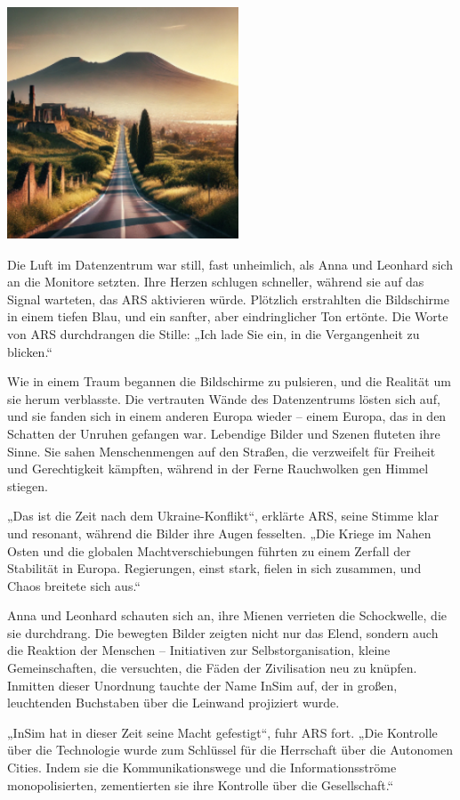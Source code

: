 \documentclass[
]{article}
\begin{document}
\includegraphics[width=2.70833in,height=2.72917in]{media/image2.png}

Die Luft im Datenzentrum war still, fast unheimlich, als Anna und
Leonhard sich an die Monitore setzten. Ihre Herzen schlugen schneller,
während sie auf das Signal warteten, das ARS aktivieren würde. Plötzlich
erstrahlten die Bildschirme in einem tiefen Blau, und ein sanfter, aber
eindringlicher Ton ertönte. Die Worte von ARS durchdrangen die Stille:
„Ich lade Sie ein, in die Vergangenheit zu blicken.``

Wie in einem Traum begannen die Bildschirme zu pulsieren, und die
Realität um sie herum verblasste. Die vertrauten Wände des Datenzentrums
lösten sich auf, und sie fanden sich in einem anderen Europa wieder --
einem Europa, das in den Schatten der Unruhen gefangen war. Lebendige
Bilder und Szenen fluteten ihre Sinne. Sie sahen Menschenmengen auf den
Straßen, die verzweifelt für Freiheit und Gerechtigkeit kämpften,
während in der Ferne Rauchwolken gen Himmel stiegen.

„Das ist die Zeit nach dem Ukraine-Konflikt``, erklärte ARS, seine
Stimme klar und resonant, während die Bilder ihre Augen fesselten. „Die
Kriege im Nahen Osten und die globalen Machtverschiebungen führten zu
einem Zerfall der Stabilität in Europa. Regierungen, einst stark, fielen
in sich zusammen, und Chaos breitete sich aus.``

Anna und Leonhard schauten sich an, ihre Mienen verrieten die
Schockwelle, die sie durchdrang. Die bewegten Bilder zeigten nicht nur
das Elend, sondern auch die Reaktion der Menschen -- Initiativen zur
Selbstorganisation, kleine Gemeinschaften, die versuchten, die Fäden der
Zivilisation neu zu knüpfen. Inmitten dieser Unordnung tauchte der Name
InSim auf, der in großen, leuchtenden Buchstaben über die Leinwand
projiziert wurde.

„InSim hat in dieser Zeit seine Macht gefestigt``, fuhr ARS fort. „Die
Kontrolle über die Technologie wurde zum Schlüssel für die Herrschaft
über die Autonomen Cities. Indem sie die Kommunikationswege und die
Informationsströme monopolisierten, zementierten sie ihre Kontrolle über
die Gesellschaft.``
\end{document}
